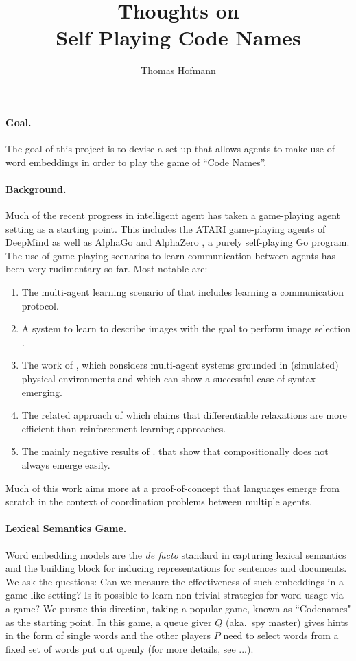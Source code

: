 \documentclass{article}
\title{
	{\large Thoughts on} \\[2mm]
	Self Playing Code Names 
}
\author{Thomas Hofmann}
\begin{document}
\maketitle 

\paragraph{Goal.} The goal of this project is to devise a set-up that allows agents to make use of word embeddings in order to play the game of ``Code Names''.

\paragraph{Background.}  Much of the recent progress in intelligent agent has taken a game-playing agent setting as a starting point. This includes the ATARI game-playing agents of DeepMind \cite{mnih2013playing} as well as AlphaGo \cite{silver2016mastering} and AlphaZero \cite{silver2017mastering}, a purely self-playing Go program. The use of game-playing scenarios to learn communication between agents has been very rudimentary so far. Most notable are: 
\begin{enumerate}
\item The multi-agent learning scenario of \cite{foerster2016learning} that includes learning a communication protocol.
\item A system to learn to describe images with the goal to perform image selection \cite{das2017learning}. 
\item The work of \cite{mordatch2017emergence}, which considers multi-agent systems grounded in (simulated) physical environments and which can show a successful case of syntax emerging. 
\item The related approach of \cite{havrylov2017emergence} which claims that differentiable relaxations are more efficient than reinforcement learning approaches. 
\item The mainly negative results of \cite{kottur2017natural}. that show that compositionally does not always emerge easily. 
\end{enumerate} 
Much of this work aims more at a proof-of-concept that languages emerge from scratch in the context of coordination problems between multiple agents. 

\paragraph{Lexical Semantics Game.} Word embedding models are  the \textit{de facto} standard in capturing lexical semantics and the building block for inducing representations for sentences and documents. We ask the questions: Can we measure the effectiveness of such embeddings in a game-like setting? Is it possible to learn non-trivial strategies for word usage via a game? We pursue this direction, taking a popular game, known as ``Codenames" as the starting point. In this game, a queue giver $Q$ (aka.~spy master) gives hints in the form of single words and the other players  $P$ need to select words from a fixed set of words put out openly (for more details, see ...). 
\end{document}
